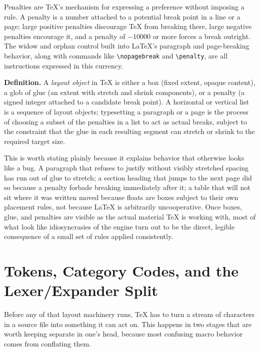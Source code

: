 Penalties are TeX's mechanism for expressing a preference without imposing a rule. A penalty is a number attached to a potential break point in a line or a page; large positive penalties discourage TeX from breaking there, large negative penalties encourage it, and a penalty of \(-10000\) or more forces a break outright. The widow and orphan control built into LaTeX's paragraph and page-breaking behavior, along with commands like \texttt{\textbackslash{}nopagebreak} and \texttt{\textbackslash{}penalty}, are all instructions expressed in this currency.

\textbf{Definition.} A \emph{layout object} in TeX is either a box (fixed extent, opaque content), a glob of glue (an extent with stretch and shrink components), or a penalty (a signed integer attached to a candidate break point). A horizontal or vertical list is a sequence of layout objects; typesetting a paragraph or a page is the process of choosing a subset of the penalties in a list to act as actual breaks, subject to the constraint that the glue in each resulting segment can stretch or shrink to the required target size.

This is worth stating plainly because it explains behavior that otherwise looks like a bug. A paragraph that refuses to justify without visibly stretched spacing has run out of glue to stretch; a section heading that jumps to the next page did so because a penalty forbade breaking immediately after it; a table that will not sit where it was written moved because floats are boxes subject to their own placement rules, not because LaTeX is arbitrarily uncooperative. Once boxes, glue, and penalties are visible as the actual material TeX is working with, most of what look like idiosyncrasies of the engine turn out to be the direct, legible consequence of a small set of rules applied consistently.

\hypertarget{tokens-category-codes-and-the-lexerexpander-split}{%
\section{Tokens, Category Codes, and the Lexer/Expander Split}\label{tokens-category-codes-and-the-lexerexpander-split}}

Before any of that layout machinery runs, TeX has to turn a stream of characters in a source file into something it can act on. This happens in two stages that are worth keeping separate in one's head, because most confusing macro behavior comes from conflating them.

